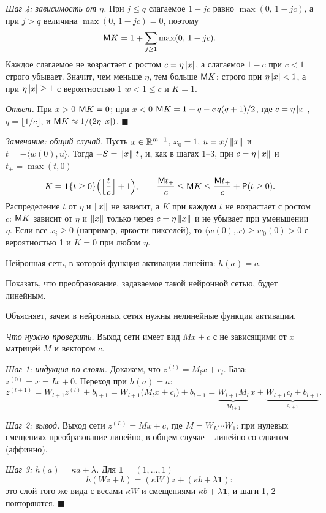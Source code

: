 \documentclass[12pt,a4paper]{article}
\begin{document}
\emph{Шаг 4: зависимость от $\eta$.} При $j \le q$ слагаемое $1 - jc$ равно
$\max(0,\, 1 - jc)$, а при $j > q$ величина $\max(0,\, 1 - jc) = 0$, поэтому
\[
  \mathsf{M} K = 1 + \sum_{j \ge 1}\max(0,\, 1 - jc) .
\]
Каждое слагаемое не возрастает с ростом $c = \eta\left\lvert x \right\rvert$, а слагаемое $1 - c$
при $c < 1$ строго убывает. Значит, чем меньше $\eta$, тем больше $\mathsf{M} K$:
строго при $\eta\left\lvert x \right\rvert < 1$, а при $\eta\left\lvert x \right\rvert \ge 1$ с вероятностью 1
$w < 1 \le c$ и $K = 1$.

\emph{Ответ.} При $x > 0$ $\mathsf{M} K = 0$; при $x < 0$
$\mathsf{M} K = 1 + q - c\,q(q+1)/2$, где $c = \eta\left\lvert x \right\rvert$, $q = \lfloor 1/c\rfloor$,
и $\mathsf{M} K \approx 1/(2\eta\left\lvert x \right\rvert)$. $\blacksquare$

\emph{Замечание: общий случай.} Пусть $x \in \mathbb{R}^{m+1}$, $x_0 = 1$,
$u = x/\left\lVert x \right\rVert$ и $t = -\langle w(0), u\rangle$. Тогда $-S = \left\lVert x \right\rVert\,t$, и, как
в шагах 1--3, при $c = \eta\left\lVert x \right\rVert$ и $t_+ = \max(t, 0)$
\[
  K = \mathbf{1}\{t \ge 0\}\Bigl(\Bigl\lfloor\frac{t}{c}\Bigr\rfloor + 1\Bigr),
  \qquad
  \frac{\mathsf{M} t_+}{c} \le \mathsf{M} K \le \frac{\mathsf{M} t_+}{c} + \mathsf{P}(t \ge 0) .
\]
Распределение $t$ от $\eta$ и $\left\lVert x \right\rVert$ не зависит, а $K$ при каждом $t$ не
возрастает с ростом $c$: $\mathsf{M} K$ зависит от $\eta$ и $\left\lVert x \right\rVert$ только через
$c = \eta\left\lVert x \right\rVert$ и не убывает при уменьшении $\eta$. Если все $x_i \ge 0$
(например, яркости пикселей), то $\langle w(0), x\rangle \ge w_0(0) > 0$ с
вероятностью 1 и $K = 0$ при любом $\eta$.

\dano Нейронная сеть, в которой функция активации линейна: $h(a) = a$.

\treb Показать, что преобразование, задаваемое такой нейронной сетью, будет
линейным.

\zachem Объясняет, зачем в нейронных сетях нужны нелинейные функции активации.

\resh \emph{Что нужно проверить.} Выход сети имеет вид $Mx + c$ с не
зависящими от $x$ матрицей $M$ и вектором $c$.

\emph{Шаг 1: индукция по слоям.} Докажем, что $z^{(l)} = M_lx + c_l$. База:
$z^{(0)} = x = Ix + 0$. Переход при $h(a) = a$:
\[
  z^{(l+1)} = W_{l+1}z^{(l)} + b_{l+1}
            = W_{l+1}\bigl(M_lx + c_l\bigr) + b_{l+1}
            = \underbrace{W_{l+1}M_l}_{M_{l+1}}\,x
            + \underbrace{W_{l+1}c_l + b_{l+1}}_{c_{l+1}} .
\]

\emph{Шаг 2: вывод.} Выход сети $z^{(L)} = Mx + c$, где $M = W_L\cdots W_1$:
при нулевых смещениях преобразование линейно, в общем случае -- линейно со
сдвигом (аффинно).

\emph{Шаг 3: $h(a) = \kappa a + \lambda$.} Для $\mathbf{1} = (1, \dots, 1)$
\[
  h(Wz + b) = (\kappa W)z + (\kappa b + \lambda\mathbf{1}) :
\]
это слой того же вида с весами $\kappa W$ и смещениями $\kappa b + \lambda\mathbf{1}$,
и шаги 1, 2 повторяются. $\blacksquare$
\end{document}
